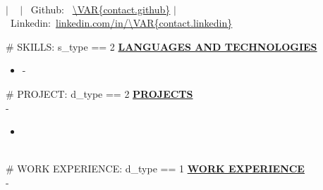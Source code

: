 \documentclass{article}
\begin{document}
\begin{center}
\thispagestyle{empty}
\Large \textbf{ } \\
\normalsize 
    $\mid$ ~
    $\mid$ ~Github:~ \url{\VAR{contact.github}}
    $\mid$ ~Linkedin:~\url{linkedin.com/in/\VAR{contact.linkedin}}
~\\\hrulefill
\end{center}
\#{ SKILLS: s_type == 2 } 
\noindent \textbf{\underline{LANGUAGES AND TECHNOLOGIES}} 
\begin{itemize}[noitemsep,nolistsep,leftmargin=*]
    \item \textbf{} - 
\end{itemize}
\#{ PROJECT: d_type == 2 }              
\noindent \textbf{\underline{PROJECTS}} \\
\noindent \textbf{} \hfill {} - \\
\textit{} %
\begin{itemize}[noitemsep,nolistsep,leftmargin=*]
    \item {} 
\end{itemize}
        ~\\
\#{ WORK EXPERIENCE: d_type == 1 }
\noindent \textbf{\underline{WORK EXPERIENCE}} \\
\noindent \textbf{} \hfill {} - \\
\textit{} \hfill \textit{} %
\end{document}
